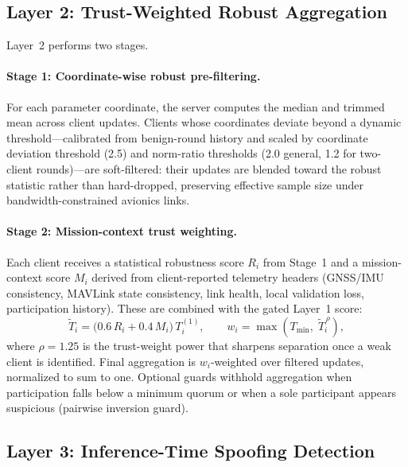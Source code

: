 \subsection{Layer 2: Trust-Weighted Robust Aggregation}
\label{sec:method-l2}

Layer~2 performs two stages.

\paragraph{Stage 1: Coordinate-wise robust pre-filtering.}
For each parameter coordinate, the server computes the median and trimmed mean across client updates.
Clients whose coordinates deviate beyond a dynamic threshold---calibrated from benign-round history and scaled by coordinate deviation threshold (2.5) and norm-ratio thresholds (2.0 general, 1.2 for two-client rounds)---are soft-filtered: their updates are blended toward the robust statistic rather than hard-dropped, preserving effective sample size under bandwidth-constrained avionics links.

\paragraph{Stage 2: Mission-context trust weighting.}
Each client receives a statistical robustness score $R_i$ from Stage~1 and a mission-context score $M_i$ derived from client-reported telemetry headers (GNSS/IMU consistency, MAVLink state consistency, link health, local validation loss, participation history).
These are combined with the gated Layer~1 score:
\begin{equation}
  \tilde{T}_i = \bigl(0.6\, R_i + 0.4\, M_i\bigr)\, T_i^{(1)},
  \qquad
  w_i = \max\!\left(T_{\min},\; \tilde{T}_i^{\,\rho}\right),
  \label{eq:l2-trust}
\end{equation}
where $\rho{=}1.25$ is the trust-weight power that sharpens separation once a weak client is identified.
Final aggregation is $w_i$-weighted over filtered updates, normalized to sum to one.
Optional guards withhold aggregation when participation falls below a minimum quorum or when a sole participant appears suspicious (pairwise inversion guard).

\subsection{Layer 3: Inference-Time Spoofing Detection}
\label{sec:method-l3}

